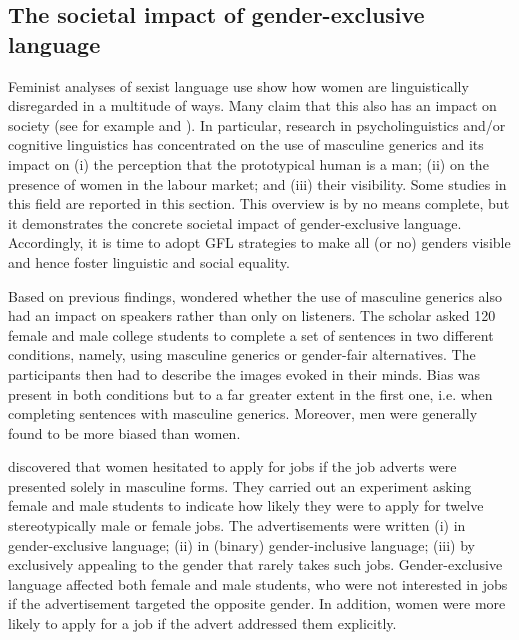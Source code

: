 \subsection{The societal impact of gender-exclusive language} \label{sub:malegenerics}
Feminist analyses of sexist language use show how women are linguistically disregarded in a multitude of ways. Many claim that this also has an impact on society (see for example \cite{gasparrini2019non} and \cite{murgia2021stai}). In particular, research in psycholinguistics and/or cognitive linguistics has concentrated on the use of masculine generics and its impact on (i) the perception that the prototypical human is a man; (ii) on the presence of women in the labour market; and (iii) their visibility. Some studies in this field are reported in this section. This overview is by no means complete, but it demonstrates the concrete societal impact of gender-exclusive language. Accordingly, it is time to adopt GFL strategies to make all (or no) genders visible and hence foster linguistic and social equality. 

Based on previous findings, \textcite{hamilton1988using} wondered whether the use of masculine generics also had an impact on speakers rather than only on listeners. The scholar asked 120 female and male college students to complete a set of sentences in two different conditions, namely, using masculine generics or gender-fair alternatives. The participants then had to describe the images evoked in their minds. Bias was present in both conditions but to a far greater extent in the first one, i.e. when completing sentences with masculine generics. Moreover, men were generally found to be more biased than women.

\textcite{bem1973does} discovered that women hesitated to apply for jobs if the job adverts were presented solely in masculine forms. They carried out an experiment asking female and male students to indicate how likely they were to apply for twelve stereotypically male or female jobs. The advertisements were written (i) in gender-exclusive language; (ii) in (binary) gender-inclusive language; (iii) by exclusively appealing to the gender that rarely takes such jobs. Gender-exclusive language affected both female and male students, who were not interested in jobs if the advertisement targeted the opposite gender. In addition, women were more likely to apply for a job if the advert addressed them explicitly. 

